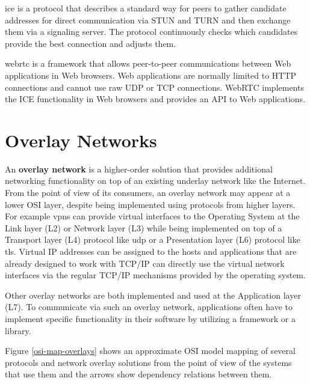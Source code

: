 \gls{ice} is a protocol that describes a standard way for peers to
gather candidate addresses for direct communication via STUN and TURN
and then exchange them via a signaling server. The protocol continuously
checks which candidates provide the best connection and adjusts them.

\gls{webrtc} is a framework that allows peer-to-peer communications
between Web applications in Web browsers. Web applications are normally
limited to HTTP connections and cannot use raw UDP or TCP connections.
WebRTC implements the ICE functionality in Web browsers and provides an
API to Web applications.


\hypertarget{sec:overlays}{%
\chapter{Overlay Networks}\label{sec:overlays}}

An \textbf{overlay network} is a higher-order solution that provides
additional networking functionality on top of an existing underlay
network like the Internet. From the point of view of its consumers, an
overlay network may appear at a lower OSI layer, despite being
implemented using protocols from higher layers. For example \glspl{vpn}
can provide virtual interfaces to the Operating System at the Link layer
(L2) or Network layer (L3) while being implemented on top of a Transport
layer (L4) protocol like \gls{udp} or a Presentation layer (L6) protocol
like \gls{tls}. Virtual IP addresses can be assigned to the hosts and
applications that are already designed to work with TCP/IP can directly
use the virtual network interfaces via the regular TCP/IP mechanisms
provided by the operating system.

Other overlay networks are both implemented and used at the Application
layer (L7). To communicate via such an overlay network, applications
often have to implement specific functionality in their software by
utilizing a framework or a library.

Figure \ref{osi-map-overlays} shows an approximate OSI model mapping of
several protocols and network overlay solutions from the point of view
of the systems that use them and the arrows show dependency relations
between them.

